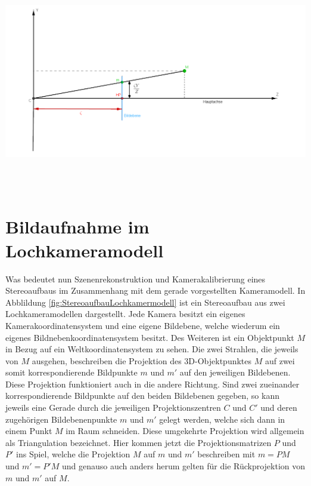 
	\begin{minipage}{\linewidth}
	\centering
	\includegraphics[width=.8\linewidth]{images/PinholeCameraModell2D.png}
	\label{fig:PinholeCamera2D}
	\end{minipage}\\ \\

\section{Bildaufnahme im Lochkameramodell}

Was bedeutet nun Szenenrekonstruktion und Kamerakalibrierung eines Stereoaufbaus im Zusammenhang mit dem gerade vorgestellten Kameramodell. In Abblildung \ref{fig:StereoaufbauLochkamermodell} ist ein Stereoaufbau aus zwei Lochkameramodellen dargestellt. Jede Kamera besitzt ein eigenes Kamerakoordinatensystem und eine eigene Bildebene, welche wiederum ein eigenes Bildnebenkoordinatensystem besitzt. Des Weiteren ist ein Objektpunkt $M$ in Bezug auf ein Weltkoordinatensystem zu sehen. Die zwei Strahlen, die jeweils von $M$ ausgehen, beschreiben die Projektion des 3D-Objektpunktes $M$ auf zwei somit korrespondierende Bildpunkte $m$ und $m'$ auf den jeweiligen Bildebenen. Diese Projektion funktioniert auch in die andere Richtung. Sind zwei zueinander korrespondierende Bildpunkte auf den beiden Bildebenen gegeben, so kann jeweils eine Gerade durch die jeweiligen Projektionszentren $C$ und $C'$ und deren zugehörigen Bildebenenpunkte $m$ und $m'$ gelegt werden, welche sich dann in einem Punkt $M$ im Raum schneiden. Diese umgekehrte Projektion  wird allgemein als Triangulation bezeichnet\cite{HZ}. Hier kommen jetzt die Projektionsmatrizen $P$ und $P'$ ins Spiel, welche die Projektion $M$ auf $m$ und $m'$ beschreiben mit $m = PM$ und $m' = P'M$ und genauso auch anders herum gelten für die Rückprojektion von $m$ und $m'$ auf $M$\cite{CamerModels.,HZ}.\\



